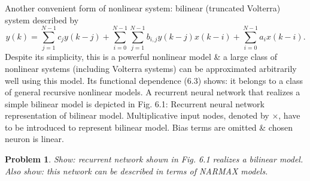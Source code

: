 \documentclass{article}
\newtheorem{problem}{Problem}
\begin{document}
\begin{enumerate}
\begin{itemize}
\begin{itemize}
			Another convenient form of nonlinear system: bilinear (truncated Volterra) system described by
			\begin{equation}
				\boxed{y(k) = \sum_{j=1}^{N-1} c_jy(k - j) + \sum_{i=0}^{N-1}\sum_{j=1}^{N-1} b_{i,j}y(k - j)x(k - i) + \sum_{i=0}^{N-1} a_ix(k - i).}
			\end{equation}
			Despite its simplicity, this is a powerful nonlinear model \& a large class of nonlinear systems (including Volterra systems) can be approximated arbitrarily well using this model. Its functional dependence (6.3) shows: it belongs to a class of general recursive nonlinear models. A recurrent neural network that realizes a simple bilinear model is depicted in {\sf Fig. 6.1: Recurrent neural network representation of bilinear model}. Multiplicative input nodes, denoted by $\times$, have to be introduced to represent bilinear model. Bias terms are omitted \& chosen neuron is linear.
			
			\begin{problem}
				Show: recurrent network shown in Fig. 6.1 realizes a bilinear model. Also show: this network can be described in terms of NARMAX models.
			\end{problem}
			

\end{itemize}
\end{itemize}
\end{enumerate}
\end{document}
